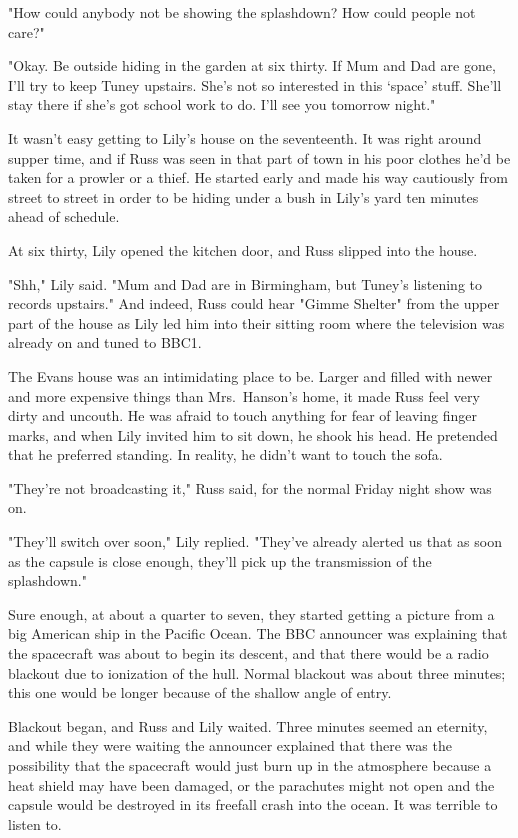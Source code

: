 "How could anybody not be showing the splashdown? How could people not care?"

"Okay. Be outside hiding in the garden at six thirty. If Mum and Dad are gone, I'll try to keep Tuney upstairs. She's not so interested in this `space' stuff. She'll stay there if she's got school work to do. I'll see you tomorrow night."

It wasn't easy getting to Lily's house on the seventeenth. It was right around supper time, and if Russ was seen in that part of town in his poor clothes he'd be taken for a prowler or a thief. He started early and made his way cautiously from street to street in order to be hiding under a bush in Lily's yard ten minutes ahead of schedule.

At six thirty, Lily opened the kitchen door, and Russ slipped into the house.

"Shh," Lily said. "Mum and Dad are in Birmingham, but Tuney's listening to records upstairs." And indeed, Russ could hear "Gimme Shelter" from the upper part of the house as Lily led him into their sitting room where the television was already on and tuned to BBC1.

The Evans house was an intimidating place to be. Larger and filled with newer and more expensive things than Mrs.~Hanson's home, it made Russ feel very dirty and uncouth. He was afraid to touch anything for fear of leaving finger marks, and when Lily invited him to sit down, he shook his head. He pretended that he preferred standing. In reality, he didn't want to touch the sofa.

"They're not broadcasting it," Russ said, for the normal Friday night show was on.

"They'll switch over soon," Lily replied. "They've already alerted us that as soon as the capsule is close enough, they'll pick up the transmission of the splashdown."

Sure enough, at about a quarter to seven, they started getting a picture from a big American ship in the Pacific Ocean. The BBC announcer was explaining that the spacecraft was about to begin its descent, and that there would be a radio blackout due to ionization of the hull. Normal blackout was about three minutes; this one would be longer because of the shallow angle of entry.

Blackout began, and Russ and Lily waited. Three minutes seemed an eternity, and while they were waiting the announcer explained that there was the possibility that the spacecraft would just burn up in the atmosphere because a heat shield may have been damaged, or the parachutes might not open and the capsule would be destroyed in its freefall crash into the ocean. It was terrible to listen to.

